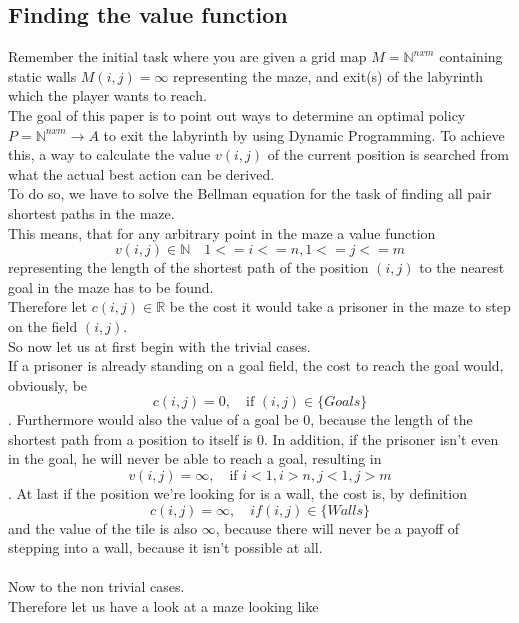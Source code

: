 \documentclass[conference]{IEEEtran}
\begin{document}
\subsection{Finding the value function}
Remember the initial task where you are given a grid map $M=\mathbb{N}^{nxm}$ containing static walls $M(i,j)=\infty$ representing the maze, and exit(s) of the labyrinth which the player wants to reach.\\
The goal of this paper is to point out ways to determine an optimal policy $P=\mathbb{N}^{nxm}\rightarrow A$ to exit the labyrinth by using Dynamic Programming. To achieve this, a way to calculate the value $v(i,j)$ of the current position is searched from what the actual best action can be derived.\\
To do so, we have to solve the Bellman equation for the task of finding all pair shortest paths in the maze.\\
This means, that for any arbitrary point in the maze a value function
\begin{equation}
v(i,j)\in \mathbb{N} \quad 1 <= i <= n, 1 <= j <= m
\end{equation}
representing the length of the shortest path of the position $(i, j)$ to the nearest goal in the maze has to be found.\\
Therefore let $c(i,j) \in \mathbb{R}$ be the cost it would take a prisoner in the maze to step on the field $(i,j)$.\\

So now let us at first begin with the trivial cases.\\
If a prisoner is already standing on a goal field, the cost to reach the goal would, obviously, be 
\begin{equation}
c(i,j) = 0, \quad \text{if } (i,j) \in \{Goals\}
\end{equation}. 
Furthermore would also the value of a goal be $0$, because the length of the shortest path from a position to itself is $0$.
In addition, if the prisoner isn't even in the goal, he will never be able to reach a goal, resulting in
\begin{equation}
v(i,j) = \infty, \quad \text{if } i < 1, i > n, j < 1, j > m
\end{equation}.
At last if the position we're looking for is a wall, the cost is, by definition
\begin{equation}
c(i,j) = \infty, \quad if (i,j) \in \{Walls\}
\end{equation}
and the value of the tile is also $\infty$, because there will never be a payoff of stepping into a wall, because it isn't possible at all.
\\\\
Now to the non trivial cases.\\
Therefore let us have a look at a maze looking like
\end{document}

